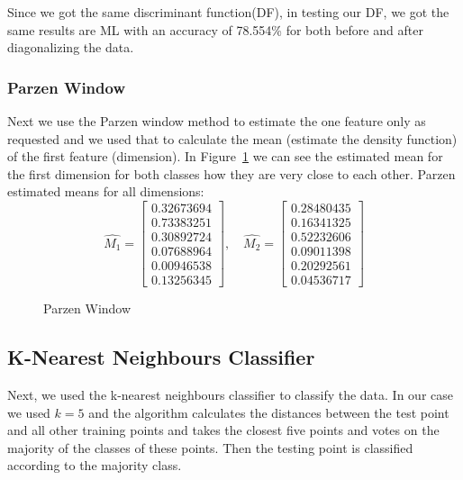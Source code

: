 \documentclass[11pt, oneside]{article}   	%
\begin{document}
Since we got the same discriminant function(DF), in testing our DF, we got the same results are ML with an accuracy of 78.554\% for both before and after diagonalizing the data.

\subsubsection*{Parzen Window}
Next we use the Parzen window method to estimate the one feature only as requested and we used that to calculate the mean (estimate the density function) of the first feature (dimension). In Figure~\ref{fig:parzen} we can see the estimated mean for the first dimension for both classes how they are very close to each other. Parzen estimated means for all dimensions:
$$\hat{M_1} = \begin{bmatrix}
0.32673694 \\ 0.73383251 \\ 0.30892724 \\ 0.07688964 \\ 0.00946538 \\ 0.13256345
\end{bmatrix},\quad \hat{M_2} = \begin{bmatrix}
0.28480435 \\ 0.16341325 \\ 0.52232606 \\ 0.09011398 \\ 0.20292561 \\ 0.04536717
\end{bmatrix}$$

\begin{figure}
\begin{center}
\end{center}
\caption{Parzen Window}
\label{fig:parzen}
\end{figure}

\subsection{K-Nearest Neighbours Classifier}
Next, we used the k-nearest neighbours classifier to classify the data. In our case we used $k=5$ and the algorithm calculates the distances between the test point and all other training points and takes the closest five points and votes on the majority of the classes of these points. Then the testing point is classified according to the majority class.
\end{document}
